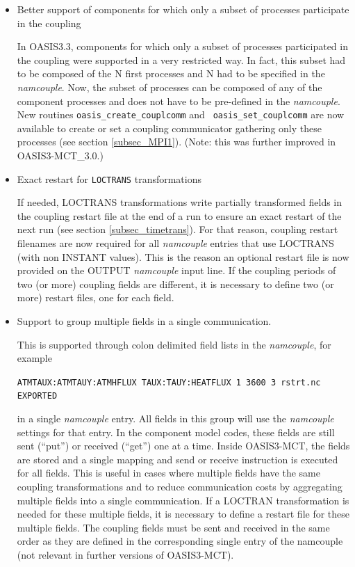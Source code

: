 \begin{itemize}

\item Better support of components for which only a subset of processes
  participate in the coupling

In OASIS3.3, components for which only a subset of processes
  participated in the coupling were supported in a very restricted
  way. In fact, this subset had to be composed of the N first
  processes and N had to be specified in the {\it namcouple}. Now, the
  subset of processes can be composed of any of the component
  processes and does not have to be pre-defined in the {\it
    namcouple}. New routines {\tt oasis\_create\_couplcomm} and {\tt
  oasis\_set\_couplcomm} are now available to create or set a coupling
  communicator gathering only these processes (see section \ref{subsec_MPI1}). (Note: this was further improved in OASIS3-MCT\_3.0.)

\item Exact restart for {\tt LOCTRANS} transformations

If needed, LOCTRANS transformations write partially
  transformed fields  in the coupling restart file at the end of a run
  to ensure an exact restart of the next run (see section
  \ref{subsec_timetrans}). For that
  reason, coupling restart filenames are now required for all {\it
    namcouple} entries that use LOCTRANS (with non INSTANT
  values). This is the reason an optional restart file is now provided
  on the OUTPUT {\it namcouple} input line. If the coupling periods of
  two (or more) coupling fields are different, it is necessary to define
  two (or more) restart files, one for each field.

\item Support to group multiple fields in a single communication.

 This is supported through colon
delimited field lists in the {\it namcouple}, for example

{\tt ATMTAUX:ATMTAUY:ATMHFLUX  TAUX:TAUY:HEATFLUX 1 3600 3 rstrt.nc EXPORTED}

 in a single {\it namcouple} entry. All fields in this group will use the
{\it namcouple} settings for that entry. In the component model codes,
these fields are still sent (``put'') or received (``get'') one at a
time. Inside OASIS3-MCT, the fields are stored and a single mapping
and send or receive instruction is executed for all fields. This is
useful in cases where multiple fields have the same coupling
transformations and to reduce communication costs by aggregating multiple
fields into a single communication. If a LOCTRAN transformation is needed
for these multiple fields, it is necessary to define a restart file for
these multiple fields. The coupling fields must be sent and received in the same order
as they are defined in the corresponding single entry of the namcouple
(not relevant in further versions of OASIS3-MCT).


\end{itemize}
